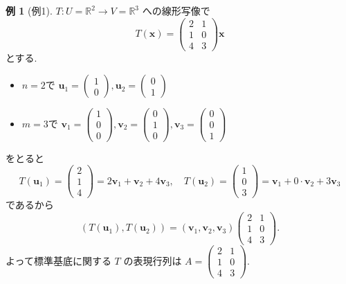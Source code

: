 \documentclass[dvipdfmx,a4paper,11pt]{article} %
\theoremstyle{definition}
\newtheorem{eg}[thm]{例}
\begin{document}
\begin{eg}[例1]
\(T : U=\mathbb{R}^2 \to V=\mathbb{R}^3\) への線形写像で
\[
T(\bm{x})=
\begin{pmatrix}
2&1\\
1&0\\
4&3
\end{pmatrix}
\bm{x}
\]とする.
\begin{itemize}
\item $n=2$で
\(
\bm{u}_1=
\begin{pmatrix}
1\\
0
\end{pmatrix},
\bm{u}_2=
\begin{pmatrix}
0\\
1
\end{pmatrix}
\)
\item 
$m=3$で
$
\bm{v}_1=
\begin{pmatrix}
1\\
0\\
0
\end{pmatrix},
\bm{v}_2=
\begin{pmatrix}
0\\
1\\
0
\end{pmatrix},
\bm{v}_3=
\begin{pmatrix}
0\\
0\\
1
\end{pmatrix}
$
\end{itemize}
をとると
\[
T(\bm{u}_1)
=
\begin{pmatrix}
2\\
1\\
4
\end{pmatrix}
=
2\bm{v}_1+\bm{v}_2+4\bm{v}_3,
\quad
T(\bm{u}_2)
=
\begin{pmatrix}
1\\
0\\
3
\end{pmatrix}
=
\bm{v}_1+0 \cdot \bm{v}_2 + 3 \bm{v}_3
\]
であるから
\[
(T(\bm{u}_1),T(\bm{u}_2))
=
(\bm{v}_1,\bm{v}_2,\bm{v}_3)
\begin{pmatrix}
2&1\\
1&0\\
4&3
\end{pmatrix}.
\]
よって標準基底に関する \(T\) の表現行列は
\(
A=
\begin{pmatrix}
2&1\\
1&0\\
4&3
\end{pmatrix}.
\)
\end{eg}
\end{document}

